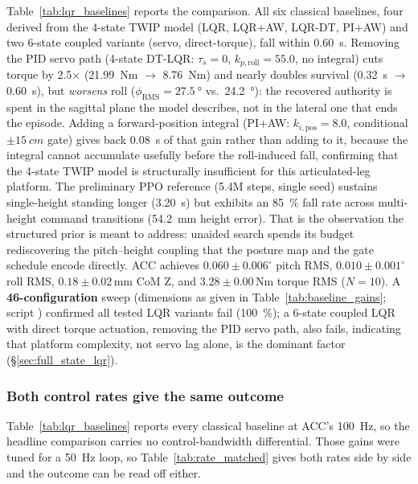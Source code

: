 \documentclass[conference]{IEEEtran}
\begin{document}
Table~\ref{tab:lqr_baselines} reports the comparison.
All six classical baselines, four derived from the 4-state TWIP model (LQR, LQR+AW, LQR-DT, PI+AW) and two 6-state coupled variants (servo, direct-torque), fall within \SI{0.60}{s}. Removing the PID servo path (4-state DT-LQR: $\tau_s{=}0$, $k_{p,\text{roll}}{=}55.0$, no integral) cuts torque by \num{2.5}$\times$ (\SI{21.99}{Nm} $\rightarrow$ \SI{8.76}{Nm}) and nearly doubles survival (\SI{0.32}{s} $\rightarrow$ \SI{0.60}{s}), but \emph{worsens} roll ($\phi_{\text{RMS}}{=}\SI{27.5}{\degree}$ vs.\ \SI{24.2}{\degree}): the recovered authority is spent in the sagittal plane the model describes, not in the lateral one that ends the episode. Adding a forward-position integral (PI+AW: $k_{i,\text{pos}}{=}8.0$, conditional $\pm\SI{15}{cm}$ gate) gives back \SI{0.08}{s} of that gain rather than adding to it, because the integral cannot accumulate usefully before the roll-induced fall, confirming that the 4-state TWIP model is structurally insufficient for this articulated-leg platform.
The preliminary PPO reference (5.4M steps, single seed) sustains single-height standing longer (\SI{3.20}{s}) but exhibits an \SI{85}{\percent} fall rate across multi-height command transitions (\SI{54.2}{mm} height error). That is the observation the structured prior is meant to address: unaided search spends its budget rediscovering the pitch--height coupling that the posture map and the gate schedule encode directly.
ACC achieves $0.060{\pm}0.006^\circ$ pitch RMS, $0.010{\pm}0.001^\circ$ roll RMS, $0.18{\pm}0.02$\,mm CoM Z, and $3.28{\pm}0.00$\,Nm torque RMS ($N{=}10$).
A \textbf{46-configuration} sweep (dimensions as given in Table~\ref{tab:baseline_gains}; script ) confirmed all tested LQR variants fail (\SI{100}{\percent}); a 6-state coupled LQR with direct torque actuation, removing the PID servo path, also fails, indicating that platform complexity, not servo lag alone, is the dominant factor (\S\ref{sec:full_state_lqr}).

\subsubsection{Both control rates give the same outcome}
\label{sec:rate_matched}

Table~\ref{tab:lqr_baselines} reports every classical baseline at ACC's \SI{100}{Hz}, so the headline comparison carries no control-bandwidth differential. Those gains were tuned for a \SI{50}{Hz} loop, so Table~\ref{tab:rate_matched} gives both rates side by side and the outcome can be read off either.
\end{document}
